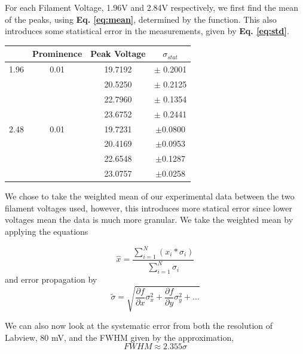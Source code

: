\documentclass[%
 reprint,
 amsmath,amssymb,
 aps,
]{revtex4-1}
\begin{document}
For each Filament Voltage, 1.96V and 2.84V respectively, we first find the mean of the peaks, using \textbf{Eq. \ref{eq:mean}}, determined by the \fp function. This also introduces some statistical error in the measurements, given by \textbf{Eq. \ref{eq:std}}.

\begin{center}
\begin{tabular}{c  c  c c }
& Prominence& Peak Voltage & $\sigma_{stat}$\\\hline
1.96 &0.01 & 19.7192 &$\pm$ 0.2001\\
        & &20.5250 &$\pm$ 0.2125\\
        & &22.7960 &$\pm$ 0.1354\\
        & &23.6752 &$\pm$ 0.2441\\\hline
2.48 &0.01 &19.7231&$\pm$0.0800\\
        & &20.4169&$\pm$0.0953\\
        &&22.6548&$\pm$0.1287\\
        &&23.0757&$\pm$0.0258\\ \hline       
\end{tabular}
\end{center}

We chose to take the weighted mean of our experimental data between the two filament voltages used, however, this introduces more statical error since lower voltages mean the data is much more granular. We take the weighted mean by applying the equations

\begin{equation}\label{eq:wm}
\hat x = \frac{\sum_{i = 1}^N (x_i * \sigma_i)}{\sum_{i = 1}^N\sigma_i}
\end{equation}
and error propagation by
\begin{equation}\label{eq:ep} 
\tilde\sigma = \sqrt{\frac{\partial f}{\partial x}\sigma_x^2 + \frac{\partial f}{\partial y}\sigma_y^2 + ...}
\end{equation}

We can also now look at the systematic error from both the resolution of Labview, 80 mV, and the FWHM given by the approximation,
\begin{equation}
FWHM \approx 2.355\sigma
\end{equation} 
\end{document}
